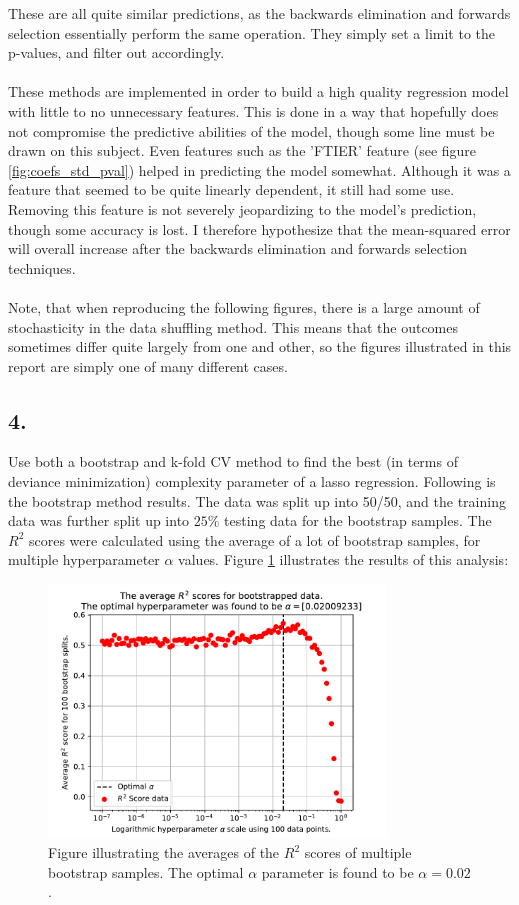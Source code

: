 \documentclass[]{article}
\begin{document}
These are all quite similar predictions, as the backwards elimination and forwards selection essentially perform the same operation. They simply set a limit to the p-values, and filter out accordingly.\\\\
These methods are implemented in order to build a high quality regression model with little to no unnecessary features. This is done in a way that hopefully does not compromise the predictive abilities of the model, though some line must be drawn on this subject. Even features such as the 'FTIER' feature (see figure \ref{fig:coefs_std_pval}) helped in predicting the model somewhat. Although it was a feature that seemed to be quite linearly dependent, it still had some use. Removing this feature is not severely jeopardizing to the model's prediction, though some accuracy is lost. I therefore hypothesize that the mean-squared error will overall increase after the backwards elimination and forwards selection techniques.\\\\
Note, that when reproducing the following figures, there is a large amount of stochasticity in the data shuffling method. This means that the outcomes sometimes differ quite largely from one and other, so the figures illustrated in this report are simply one of many different cases.

\subsection*{4.}
Use both a bootstrap and k-fold CV method to find the best (in terms of deviance minimization) complexity parameter of a lasso regression.
Following is the bootstrap method results. The data was split up into 50/50, and the training data was further split up into $25\%$ testing data for the bootstrap samples. The $R^2$ scores were calculated using the average of a lot of bootstrap samples, for multiple hyperparameter $\alpha$ values. Figure \ref{fig:bootstrapE1} illustrates the results of this analysis:
\begin{figure}[H]
	\centering
	\includegraphics[width=0.8\textwidth]{figures/Bootstrap_E1.pdf}
	\caption{Figure illustrating the averages of the $R^2$ scores of multiple bootstrap samples. The optimal $\alpha$ parameter is found to be $\alpha=0.02$.}
	\label{fig:bootstrapE1}
\end{figure}
\end{document}
